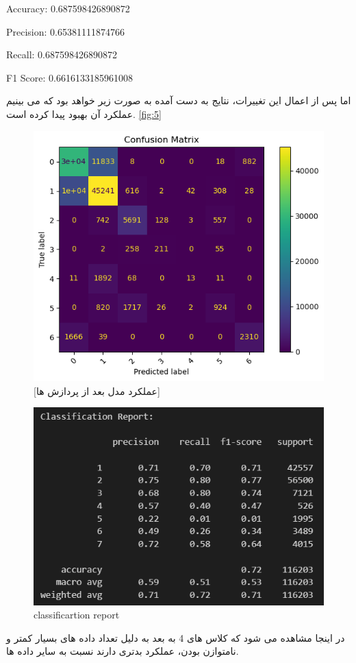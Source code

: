 \documentclass{article}
\begin{document}
Accuracy: 0.687598426890872

Precision: 0.65381111874766

Recall: 0.687598426890872

F1 Score: 0.6616133185961008

اما پس از اعمال این تغییرات، نتایج به دست آمده به صورت زیر خواهد بود که می بینیم عملکرد آن بهبود پیدا کرده است. \autoref{fig:5}
\begin{figure}[h!]
	\centering
	\includegraphics[width=0.7\linewidth]{5}
	\caption{[عملکرد مدل بعد از پردازش ها]}
	\label{fig:5}
\end{figure}
\clearpage
\begin{figure}[h!]
	\centering
	\includegraphics[width=0.7\linewidth]{6}
	\caption[]{classificartion report}
	\label{fig:6}
\end{figure}
\clearpage
در اینجا مشاهده می شود که کلاس های 4 به بعد به دلیل تعداد داده های بسیار کمتر و نامتوازن بودن، عملکرد بدتری دارند نسبت به سایر داده ها. 
\end{document}

